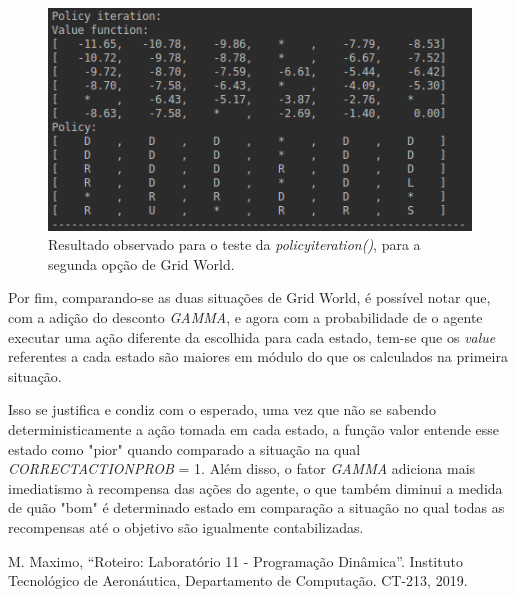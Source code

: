 \documentclass[conference]{IEEEtran}
\begin{document}
\begin{figure}[htbp]
\centering
\centerline{\includegraphics[scale=0.5]{imagens/grid2/policy_iteration.png}}
\caption{Resultado observado para o teste da \textit{policy\underline{\space}iteration()}, para a segunda opção de Grid World.}
\label{grid2/policy_iteration}
\end{figure}

Por fim, comparando-se as duas situações de Grid World, é possível notar que, com a adição do desconto \textit{GAMMA}, e agora com a probabilidade de o agente executar uma ação diferente da escolhida para cada estado, tem-se que os \textit{value} referentes a cada estado são maiores em módulo do que os calculados na primeira situação.

Isso se justifica e condiz com o esperado, uma vez que não se sabendo deterministicamente a ação tomada em cada estado, a função valor entende esse estado como "pior" quando comparado a situação na qual \textit{CORRECT\underline{\space}ACTION\underline{\space}PROB} = 1. Além disso, o fator \textit{GAMMA} adiciona mais imediatismo à recompensa das ações do agente, o que também diminui a medida de quão "bom" é determinado estado em comparação a situação no qual todas as recompensas até o objetivo são igualmente contabilizadas.

\begin{thebibliography}{00}
 M. Maximo, ``Roteiro: Laboratório 11 - Programação Dinâmica''. Instituto Tecnológico de Aeronáutica, Departamento de Computação. CT-213, 2019.
\end{thebibliography}
\end{document}
